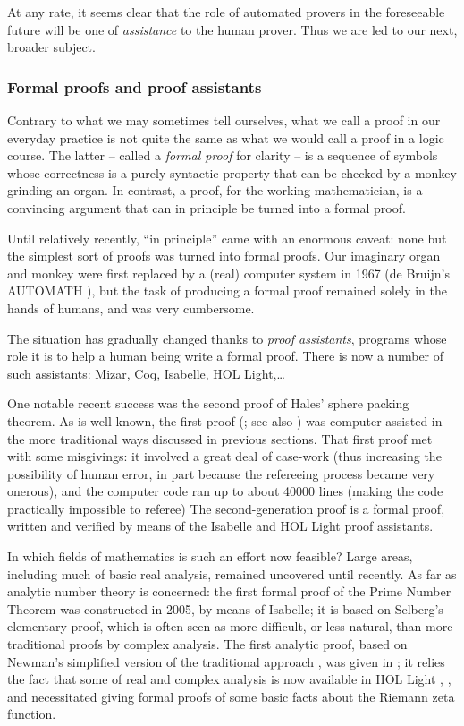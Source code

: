 At any rate, it seems clear that the role of automated provers in the
foreseeable future will be one of {\em assistance} to the human prover.
Thus we are led to our next, broader subject.

\subsubsection{Formal proofs and proof assistants}

Contrary to what we may sometimes tell ourselves,
what we call a proof in our everyday practice is not quite the same as what
we would call a proof in a logic course. The latter -- called a
{\em formal proof} for clarity -- is a sequence of symbols whose
correctness is a purely
syntactic property that can be checked by a monkey grinding
an organ. In contrast, a proof, for the working mathematician, is a convincing
argument that can in principle be turned into a formal proof.

Until relatively
recently, ``in principle'' came with an enormous caveat: none but the
simplest sort of proofs was turned into formal proofs. Our imaginary
organ and monkey were first replaced by a (real) computer system in 1967
(de Bruijn's AUTOMATH \cite{de1970mathematical}),
but the task of producing a formal proof remained solely
in the hands of humans, and was very cumbersome.

The situation has
gradually changed thanks to {\em proof assistants}, programs whose role it is
to help a human being write a formal proof. There is now a number of such
assistants: Mizar, Coq, Isabelle, HOL Light,\dots

One notable recent success was the second proof of Hales'
sphere packing theorem. As is well-known, the first proof
(\cite{Hales2005}; see also \cite{lagarias2011kepler}) 
was computer-assisted in the more traditional ways discussed in previous
sections. That first proof
met with some misgivings: it involved a great deal of case-work
(thus increasing the possibility of human error, in part because
the
refereeing process became very onerous), and the computer code 
ran up to about 40000 lines (making the code practically impossible to referee)
The second-generation proof \cite{Halesetal2017a} is a formal proof,
written and verified by means of the Isabelle and HOL Light proof assistants.

In which fields of mathematics is such an effort now feasible?
Large areas, including much of basic real analysis, remained uncovered until
recently. As far as analytic number theory is concerned: the first formal
proof of the Prime Number Theorem \cite{avigad2007formally} was constructed
in 2005, by means of Isabelle; it is based on Selberg's elementary proof,
which is
often seen as more difficult, or less natural, than more traditional proofs
by complex analysis. The first analytic proof, based on Newman's simplified
version of the traditional approach \cite{newman1980simple}, was given in
\cite{harrison-pnt}; it relies the fact that some of real and complex analysis
is now available in HOL Light \cite{harrison2005hol}, \cite{harrison2007formalizing}, and necessitated giving
formal proofs of some basic facts about the Riemann zeta function. 

